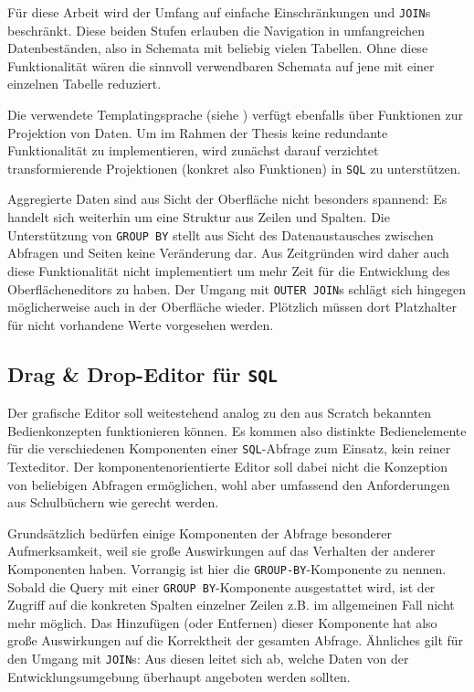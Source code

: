 Für diese Arbeit wird der Umfang auf einfache Einschränkungen und \texttt{JOIN}s beschränkt. Diese beiden Stufen erlauben die Navigation in umfangreichen Datenbeständen, also in Schemata mit beliebig vielen Tabellen. Ohne diese Funktionalität wären die sinnvoll verwendbaren Schemata auf jene mit einer einzelnen Tabelle reduziert.

Die verwendete Templatingsprache (siehe ) verfügt ebenfalls über Funktionen zur Projektion von Daten. Um im Rahmen der Thesis keine redundante Funktionalität zu implementieren, wird zunächst darauf verzichtet transformierende Projektionen (konkret also Funktionen) in \texttt{SQL} zu unterstützen.

Aggregierte Daten sind aus Sicht der Oberfläche nicht besonders spannend: Es handelt sich weiterhin um eine Struktur aus Zeilen und Spalten. Die Unterstützung von \texttt{GROUP BY} stellt aus Sicht des Datenaustausches zwischen Abfragen und Seiten keine Veränderung dar. Aus Zeitgründen wird daher auch diese Funktionalität nicht implementiert um mehr Zeit für die Entwicklung des Oberflächeneditors zu haben. Der Umgang mit \texttt{OUTER JOIN}s schlägt sich hingegen möglicherweise auch in der Oberfläche wieder. Plötzlich müssen dort Platzhalter für nicht vorhandene Werte vorgesehen werden.

\subsection{Drag \& Drop-Editor für \texttt{SQL}}
\label{sec:design-sql-editor}

Der grafische Editor soll weitestehend analog zu den aus Scratch bekannten Bedienkonzepten funktionieren können. Es kommen also distinkte Bedienelemente für die verschiedenen Komponenten einer \texttt{SQL}-Abfrage zum Einsatz, kein reiner Texteditor. Der komponentenorientierte Editor soll dabei nicht die Konzeption von beliebigen Abfragen ermöglichen, wohl aber umfassend den Anforderungen aus Schulbüchern wie \cite{grimm_informatik_2015, hubwieser_inf_2} gerecht werden.

Grundsätzlich bedürfen einige Komponenten der Abfrage besonderer Aufmerksamkeit, weil sie große Auswirkungen auf das Verhalten der anderer Komponenten haben. Vorrangig ist hier die \texttt{GROUP-BY}-Komponente zu nennen. Sobald die Query mit einer \texttt{GROUP BY}-Komponente ausgestattet wird, ist der Zugriff auf die konkreten Spalten einzelner Zeilen z.B. im allgemeinen Fall nicht mehr möglich. Das Hinzufügen (oder Entfernen) dieser Komponente hat also große Auswirkungen auf die Korrektheit der gesamten Abfrage. Ähnliches gilt für den Umgang mit \texttt{JOIN}s: Aus diesen leitet sich ab, welche Daten von der Entwicklungsumgebung überhaupt angeboten werden sollten.

